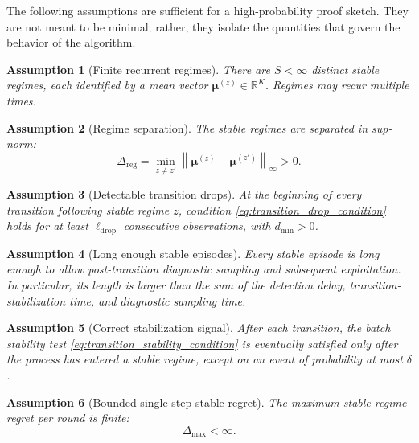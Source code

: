 \documentclass[11pt]{article}
\newtheorem{assumption}{Assumption}
\newcommand{\R}{\mathbb R}
\newcommand{\norm}[1]{\left\lVert #1 \right\rVert}
\begin{document}
The following assumptions are sufficient for a high-probability proof sketch. They are not meant to be minimal; rather, they isolate the quantities that govern the behavior of the algorithm.

\begin{assumption}[Finite recurrent regimes]
\label{ass:finite_regimes}
There are $S<\infty$ distinct stable regimes, each identified by a mean vector $\bm\mu^{(z)}\in\R^K$. Regimes may recur multiple times.
\end{assumption}

\begin{assumption}[Regime separation]
\label{ass:regime_separation}
The stable regimes are separated in sup-norm:
\begin{equation}
\label{eq:ass_regime_separation}
\Delta_{\mathrm{reg}}
=
\min_{z\neq z'}
\norm{\bm\mu^{(z)}-\bm\mu^{(z')}}_{\infty}
>0.
\end{equation}
\end{assumption}

\begin{assumption}[Detectable transition drops]
\label{ass:detectable_drop}
At the beginning of every transition following stable regime $z$, condition \eqref{eq:transition_drop_condition} holds for at least $\ell_{\mathrm{drop}}$ consecutive observations, with $d_{\min}>0$.
\end{assumption}

\begin{assumption}[Long enough stable episodes]
\label{ass:long_episodes}
Every stable episode is long enough to allow post-transition diagnostic sampling and subsequent exploitation. In particular, its length is larger than the sum of the detection delay, transition-stabilization time, and diagnostic sampling time.
\end{assumption}

\begin{assumption}[Correct stabilization signal]
\label{ass:stabilization}
After each transition, the batch stability test \eqref{eq:transition_stability_condition} is eventually satisfied only after the process has entered a stable regime, except on an event of probability at most $\delta$.
\end{assumption}

\begin{assumption}[Bounded single-step stable regret]
\label{ass:bounded_gap}
The maximum stable-regime regret per round is finite:
\begin{equation}
\label{eq:bounded_single_step_regret}
\Delta_{\max}<\infty.
\end{equation}
\end{assumption}
\end{document}
